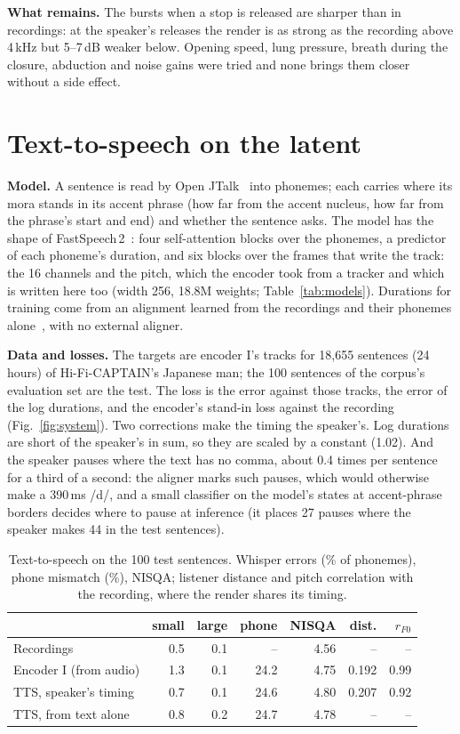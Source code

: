 \documentclass[10pt,a4paper,twocolumn]{article}
\begin{document}
\textbf{What remains.} The bursts when a stop is released are sharper than in recordings: at the
speaker's releases the render is as strong as the recording above 4\,kHz but 5--7\,dB weaker
below. Opening speed, lung pressure, breath during the closure, abduction and noise gains were
tried and none brings them closer without a side effect.

\section{Text-to-speech on the latent}\label{sec:tts}
\textbf{Model.} A sentence is read by Open JTalk~\cite{openjtalk} into phonemes; each carries
where its mora stands in its accent phrase (how far from the accent nucleus, how far from the
phrase's start and end) and whether the sentence asks. The model has the shape of
FastSpeech\,2~\cite{fastspeech2}: four self-attention blocks over the phonemes, a predictor of
each phoneme's duration, and six blocks over the frames that write the track: the 16 channels
and the pitch, which the encoder took from a tracker and which is written here too (width 256,
18.8M weights; Table~\ref{tab:models}). Durations for training come from an alignment learned from the recordings and
their phonemes alone~\cite{ota}, with no external aligner.

\textbf{Data and losses.} The targets are encoder I's tracks for 18,655 sentences (24 hours) of
Hi-Fi-CAPTAIN's Japanese man; the 100 sentences of the corpus's evaluation set are the test. The
loss is the error against those tracks, the error of the log durations, and the encoder's
stand-in loss against the recording (Fig.~\ref{fig:system}). Two corrections make the timing the
speaker's. Log durations are short of the speaker's in sum, so they are scaled by a constant
(1.02). And the speaker pauses where the text has no comma, about 0.4 times per sentence for a
third of a second: the aligner marks such pauses, which would otherwise make a 390\,ms /d/, and
a small classifier on the model's states at accent-phrase borders decides where to pause at
inference (it places 27 pauses where the speaker makes 44 in the test sentences).

\begin{table}[t]
\centering\footnotesize\setlength{\tabcolsep}{2.2pt}
\caption{Text-to-speech on the 100 test sentences. Whisper errors (\% of phonemes), phone
mismatch (\%), NISQA; listener distance and pitch correlation with the recording, where the
render shares its timing.}
\label{tab:tts}
\begin{tabular}{@{}lrrrrrr@{}}
\toprule
& small & large & phone & NISQA & dist. & $r_{F0}$\\
\midrule
Recordings & 0.5 & 0.1 & -- & 4.56 & -- & --\\
Encoder I (from audio) & 1.3 & 0.1 & 24.2 & 4.75 & 0.192 & 0.99\\
TTS, speaker's timing & 0.7 & 0.1 & 24.6 & 4.80 & 0.207 & 0.92\\
TTS, from text alone & 0.8 & 0.2 & 24.7 & 4.78 & -- & --\\
\bottomrule
\end{tabular}
\end{table}
\end{document}
